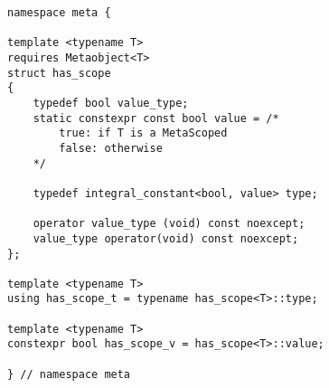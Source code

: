 
\begin{verbatim}
namespace meta {

template <typename T>
requires Metaobject<T>
struct has_scope
{
	typedef bool value_type;
	static constexpr const bool value = /*
		true: if T is a MetaScoped
		false: otherwise
	*/

	typedef integral_constant<bool, value> type;

	operator value_type (void) const noexcept;
	value_type operator(void) const noexcept;
};

template <typename T>
using has_scope_t = typename has_scope<T>::type;

template <typename T>
constexpr bool has_scope_v = has_scope<T>::value;

} // namespace meta
\end{verbatim}
